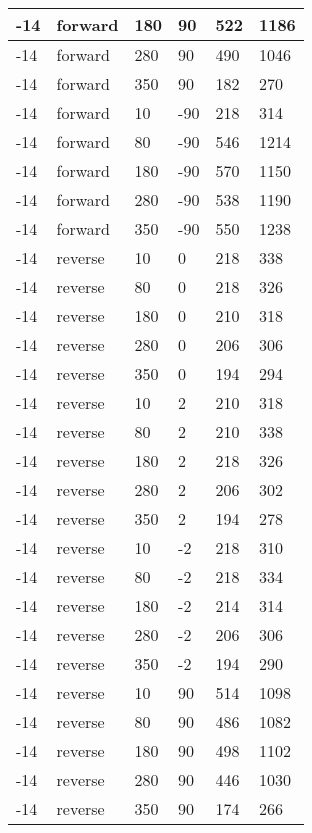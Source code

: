 \begin{longtable}{|l|l|l|l|l|l|}
			\hline
			-14 & forward & 180 & 90 & 522 & 1186 \\
			\hline
			-14 & forward & 280 & 90 & 490 & 1046 \\
			\hline
			-14 & forward & 350 & 90 & 182 & 270 \\
			\hline
			-14 & forward & 10 & -90 & 218 & 314 \\
			\hline
			-14 & forward & 80 & -90 & 546 & 1214 \\
			\hline
			-14 & forward & 180 & -90 & 570 & 1150 \\
			\hline
			-14 & forward & 280 & -90 & 538 & 1190 \\
			\hline
			-14 & forward & 350 & -90 & 550 & 1238 \\
			\hline
			-14 & reverse & 10 & 0 & 218 & 338 \\
			\hline
			-14 & reverse & 80 & 0 & 218 & 326 \\
			\hline
			-14 & reverse & 180 & 0 & 210 & 318 \\
			\hline
			-14 & reverse & 280 & 0 & 206 & 306 \\
			\hline
			-14 & reverse & 350 & 0 & 194 & 294 \\
			\hline
			-14 & reverse & 10 & 2 & 210 & 318 \\
			\hline
			-14 & reverse & 80 & 2 & 210 & 338 \\
			\hline
			-14 & reverse & 180 & 2 & 218 & 326 \\
			\hline
			-14 & reverse & 280 & 2 & 206 & 302 \\
			\hline
			-14 & reverse & 350 & 2 & 194 & 278 \\
			\hline
			-14 & reverse & 10 & -2 & 218 & 310 \\
			\hline
			-14 & reverse & 80 & -2 & 218 & 334 \\
			\hline
			-14 & reverse & 180 & -2 & 214 & 314 \\
			\hline
			-14 & reverse & 280 & -2 & 206 & 306 \\
			\hline
			-14 & reverse & 350 & -2 & 194 & 290 \\
			\hline
			-14 & reverse & 10 & 90 & 514 & 1098 \\
			\hline
			-14 & reverse & 80 & 90 & 486 & 1082 \\
			\hline
			-14 & reverse & 180 & 90 & 498 & 1102 \\
			\hline
			-14 & reverse & 280 & 90 & 446 & 1030 \\
			\hline
			-14 & reverse & 350 & 90 & 174 & 266 \\
			\hline

\end{longtable}
